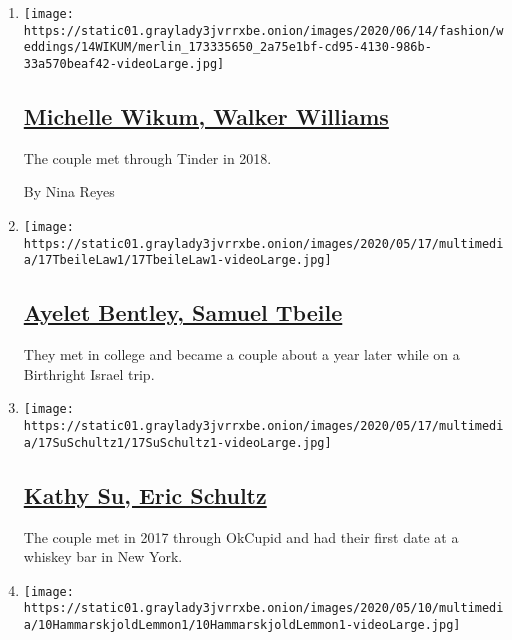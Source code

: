 \begin{enumerate}
\def\labelenumi{\arabic{enumi}.}
\item
  \texttt{[image: https://static01.graylady3jvrrxbe.onion/images/2020/06/14/fashion/weddings/14WIKUM/merlin\_173335650\_2a75e1bf-cd95-4130-986b-33a570beaf42-videoLarge.jpg]}

  \hypertarget{michelle-wikum-walker-williams}{%
  \subsection{\texorpdfstring{\href{/2020/06/14/fashion/weddings/michelle-wikum-walker-williams.html}{Michelle
  Wikum, Walker
  Williams}}{Michelle Wikum, Walker Williams}}\label{michelle-wikum-walker-williams}}

  The couple met through Tinder in 2018.

  By Nina Reyes
\item
  \texttt{[image: https://static01.graylady3jvrrxbe.onion/images/2020/05/17/multimedia/17TbeileLaw1/17TbeileLaw1-videoLarge.jpg]}

  \hypertarget{ayelet-bentley-samuel-tbeile}{%
  \subsection{\texorpdfstring{\href{/2020/05/17/fashion/weddings/ayelet-bentley-samuel-tbeile.html}{Ayelet
  Bentley, Samuel
  Tbeile}}{Ayelet Bentley, Samuel Tbeile}}\label{ayelet-bentley-samuel-tbeile}}

  They met in college and became a couple about a year later while on a
  Birthright Israel trip.
\item
  \texttt{[image: https://static01.graylady3jvrrxbe.onion/images/2020/05/17/multimedia/17SuSchultz1/17SuSchultz1-videoLarge.jpg]}

  \hypertarget{kathy-su-eric-schultz}{%
  \subsection{\texorpdfstring{\href{/2020/05/17/fashion/weddings/kathy-su-eric-schultz.html}{Kathy
  Su, Eric
  Schultz}}{Kathy Su, Eric Schultz}}\label{kathy-su-eric-schultz}}

  The couple met in 2017 through OkCupid and had their first date at a
  whiskey bar in New York.
\item
  \texttt{[image: https://static01.graylady3jvrrxbe.onion/images/2020/05/10/multimedia/10HammarskjoldLemmon1/10HammarskjoldLemmon1-videoLarge.jpg]}


\end{enumerate}
